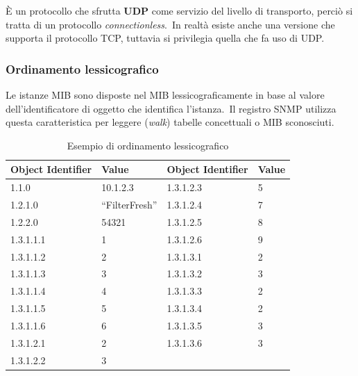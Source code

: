 È un protocollo che sfrutta \textbf{UDP} come servizio del livello di transporto, perciò si tratta di un protocollo \textit{connectionless}.\
In realtà esiste anche una versione che supporta il protocollo TCP, tuttavia si privilegia quella che fa uso di UDP.\

\subsubsection{Ordinamento lessicografico}

Le istanze MIB sono disposte nel MIB lessicograficamente in base al valore dell'identificatore di oggetto che identifica l'istanza.\
Il registro SNMP utilizza questa caratteristica per leggere (\textit{walk}) tabelle concettuali o MIB sconosciuti.\

\begin{table}[H]
    \centering
    \begin{tabular}{|l|l|l|l|}
        \hline
        \textbf{Object Identifier} & \textbf{Value}  & \textbf{Object Identifier} & \textbf{Value} \\\hline \hline
        1.1.0                      & 10.1.2.3        & 1.3.1.2.3                  & 5              \\
        1.2.1.0                    & ``FilterFresh'' & 1.3.1.2.4                  & 7              \\
        1.2.2.0                    & 54321           & 1.3.1.2.5                  & 8              \\
        1.3.1.1.1                  & 1               & 1.3.1.2.6                  & 9              \\
        1.3.1.1.2                  & 2               & 1.3.1.3.1                  & 2              \\
        1.3.1.1.3                  & 3               & 1.3.1.3.2                  & 3              \\
        1.3.1.1.4                  & 4               & 1.3.1.3.3                  & 2              \\
        1.3.1.1.5                  & 5               & 1.3.1.3.4                  & 2              \\
        1.3.1.1.6                  & 6               & 1.3.1.3.5                  & 3              \\
        1.3.1.2.1                  & 2               & 1.3.1.3.6                  & 3              \\
        1.3.1.2.2                  & 3               &                            &                \\\hline
    \end{tabular}
    \caption*{Esempio di ordinamento lessicografico}
\end{table}

